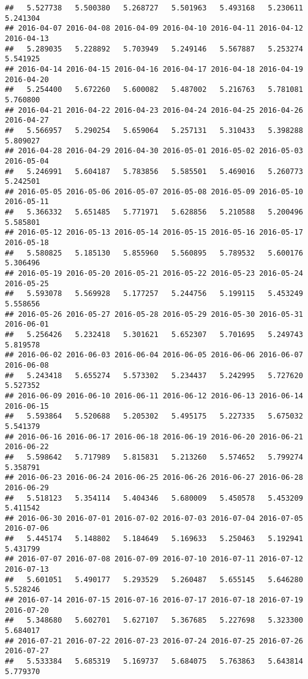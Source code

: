 \documentclass[
]{article}
\begin{document}
\begin{verbatim}
##   5.527738   5.500380   5.268727   5.501963   5.493168   5.230611   5.241304 
## 2016-04-07 2016-04-08 2016-04-09 2016-04-10 2016-04-11 2016-04-12 2016-04-13 
##   5.289035   5.228892   5.703949   5.249146   5.567887   5.253274   5.541925 
## 2016-04-14 2016-04-15 2016-04-16 2016-04-17 2016-04-18 2016-04-19 2016-04-20 
##   5.254400   5.672260   5.600082   5.487002   5.216763   5.781081   5.760800 
## 2016-04-21 2016-04-22 2016-04-23 2016-04-24 2016-04-25 2016-04-26 2016-04-27 
##   5.566957   5.290254   5.659064   5.257131   5.310433   5.398288   5.809027 
## 2016-04-28 2016-04-29 2016-04-30 2016-05-01 2016-05-02 2016-05-03 2016-05-04 
##   5.246991   5.604187   5.783856   5.585501   5.469016   5.260773   5.242501 
## 2016-05-05 2016-05-06 2016-05-07 2016-05-08 2016-05-09 2016-05-10 2016-05-11 
##   5.366332   5.651485   5.771971   5.628856   5.210588   5.200496   5.585801 
## 2016-05-12 2016-05-13 2016-05-14 2016-05-15 2016-05-16 2016-05-17 2016-05-18 
##   5.580825   5.185130   5.855960   5.560895   5.789532   5.600176   5.306496 
## 2016-05-19 2016-05-20 2016-05-21 2016-05-22 2016-05-23 2016-05-24 2016-05-25 
##   5.593078   5.569928   5.177257   5.244756   5.199115   5.453249   5.558656 
## 2016-05-26 2016-05-27 2016-05-28 2016-05-29 2016-05-30 2016-05-31 2016-06-01 
##   5.256426   5.232418   5.301621   5.652307   5.701695   5.249743   5.819578 
## 2016-06-02 2016-06-03 2016-06-04 2016-06-05 2016-06-06 2016-06-07 2016-06-08 
##   5.243418   5.655274   5.573302   5.234437   5.242995   5.727620   5.527352 
## 2016-06-09 2016-06-10 2016-06-11 2016-06-12 2016-06-13 2016-06-14 2016-06-15 
##   5.593864   5.520688   5.205302   5.495175   5.227335   5.675032   5.541379 
## 2016-06-16 2016-06-17 2016-06-18 2016-06-19 2016-06-20 2016-06-21 2016-06-22 
##   5.598642   5.717989   5.815831   5.213260   5.574652   5.799274   5.358791 
## 2016-06-23 2016-06-24 2016-06-25 2016-06-26 2016-06-27 2016-06-28 2016-06-29 
##   5.518123   5.354114   5.404346   5.680009   5.450578   5.453209   5.411542 
## 2016-06-30 2016-07-01 2016-07-02 2016-07-03 2016-07-04 2016-07-05 2016-07-06 
##   5.445174   5.148802   5.184649   5.169633   5.250463   5.192941   5.431799 
## 2016-07-07 2016-07-08 2016-07-09 2016-07-10 2016-07-11 2016-07-12 2016-07-13 
##   5.601051   5.490177   5.293529   5.260487   5.655145   5.646280   5.528246 
## 2016-07-14 2016-07-15 2016-07-16 2016-07-17 2016-07-18 2016-07-19 2016-07-20 
##   5.348680   5.602701   5.627107   5.367685   5.227698   5.323300   5.684017 
## 2016-07-21 2016-07-22 2016-07-23 2016-07-24 2016-07-25 2016-07-26 2016-07-27 
##   5.533384   5.685319   5.169737   5.684075   5.763863   5.643814   5.779370 

\end{verbatim}
\end{document}
